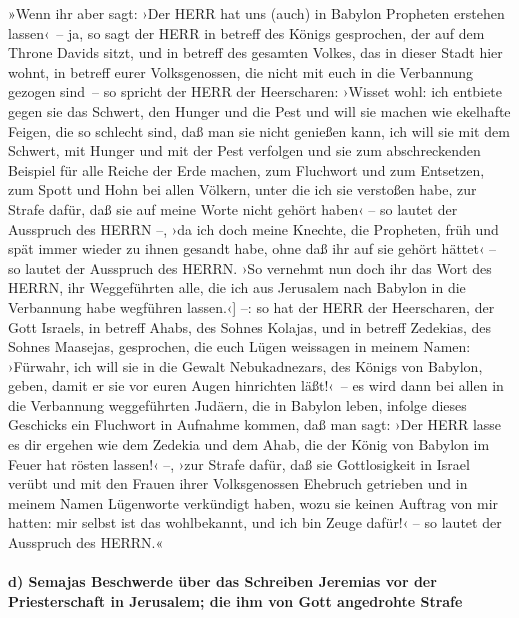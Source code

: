 »Wenn ihr aber sagt: ›Der HERR hat uns (auch) in Babylon
Propheten erstehen lassen‹~-- \bibleverse{16}{[}ja, so sagt der HERR in
betreff des Königs gesprochen, der auf dem Throne Davids sitzt, und in
betreff des gesamten Volkes, das in dieser Stadt hier wohnt, in betreff
eurer Volksgenossen, die nicht mit euch in die Verbannung gezogen
sind~-- so spricht der HERR der Heerscharen: ›Wisset
wohl: ich entbiete gegen sie das Schwert, den Hunger und die Pest und
will sie machen wie ekelhafte Feigen, die so schlecht sind, daß man sie
nicht genießen kann, ich will sie mit dem Schwert, mit
Hunger und mit der Pest verfolgen und sie zum abschreckenden Beispiel
für alle Reiche der Erde machen, zum Fluchwort und zum Entsetzen, zum
Spott und Hohn bei allen Völkern, unter die ich sie verstoßen habe,
zur Strafe dafür, daß sie auf meine Worte nicht gehört
haben‹ -- so lautet der Ausspruch des HERRN --, ›da ich doch meine
Knechte, die Propheten, früh und spät immer wieder zu ihnen gesandt
habe, ohne daß ihr auf sie gehört hättet‹ -- so lautet der Ausspruch des
HERRN. ›So vernehmt nun doch ihr das Wort des HERRN, ihr
Weggeführten alle, die ich aus Jerusalem nach Babylon in die Verbannung
habe wegführen lassen.‹{]} --: so hat der HERR der
Heerscharen, der Gott Israels, in betreff Ahabs, des Sohnes Kolajas, und
in betreff Zedekias, des Sohnes Maasejas, gesprochen, die euch Lügen
weissagen in meinem Namen: ›Fürwahr, ich will sie in die Gewalt
Nebukadnezars, des Königs von Babylon, geben, damit er sie vor euren
Augen hinrichten läßt!‹~-- es wird dann bei allen in die
Verbannung weggeführten Judäern, die in Babylon leben, infolge dieses
Geschicks ein Fluchwort in Aufnahme kommen, daß man sagt: ›Der HERR
lasse es dir ergehen wie dem Zedekia und dem Ahab, die der König von
Babylon im Feuer hat rösten lassen!‹ --, ›zur Strafe
dafür, daß sie Gottlosigkeit in Israel verübt und mit den Frauen ihrer
Volksgenossen Ehebruch getrieben und in meinem Namen Lügenworte
verkündigt haben, wozu sie keinen Auftrag von mir hatten: mir selbst ist
das wohlbekannt, und ich bin Zeuge dafür!‹ -- so lautet der Ausspruch
des HERRN.«

\hypertarget{d-semajas-beschwerde-uxfcber-das-schreiben-jeremias-vor-der-priesterschaft-in-jerusalem-die-ihm-von-gott-angedrohte-strafe}{%
\paragraph{d) Semajas Beschwerde über das Schreiben Jeremias vor der
Priesterschaft in Jerusalem; die ihm von Gott angedrohte
Strafe}\label{d-semajas-beschwerde-uxfcber-das-schreiben-jeremias-vor-der-priesterschaft-in-jerusalem-die-ihm-von-gott-angedrohte-strafe}}

